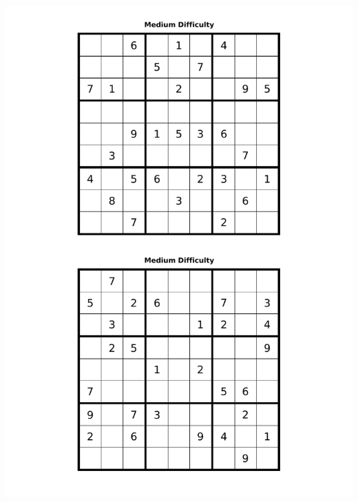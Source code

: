 \documentclass[10pt,a4paper,twoside]{report}
\begin{document}
\vspace{\fill}
\includegraphics[height=24cm]{easy.pdf}
\vspace{\fill}
\end{document}
